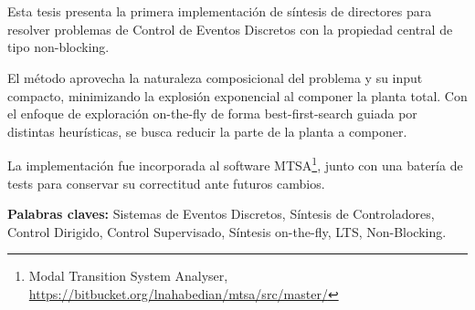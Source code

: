 \chapter*{\runtitulo}

\noindent 

Esta tesis presenta la primera implementación de síntesis de directores para resolver problemas de Control de Eventos Discretos con la propiedad central de tipo non-blocking.

El método aprovecha la naturaleza composicional del problema y su input compacto, minimizando la explosión exponencial al componer la planta total. Con el enfoque de exploración on-the-fly de forma best-first-search guiada por distintas heurísticas, se busca reducir la parte de la planta a componer. 

La implementación fue incorporada al software MTSA\footnote{Modal Transition System Analyser, \href{https://bitbucket.org/lnahabedian/mtsa/src/master/^}{https://bitbucket.org/lnahabedian/mtsa/src/master/}}, junto con una batería de tests para conservar su correctitud ante futuros cambios.
 


%
%

\bigskip

\noindent\textbf{Palabras claves:} Sistemas de Eventos Discretos, Síntesis de Controladores, Control Dirigido, Control Supervisado, Síntesis on-the-fly, LTS, Non-Blocking.


